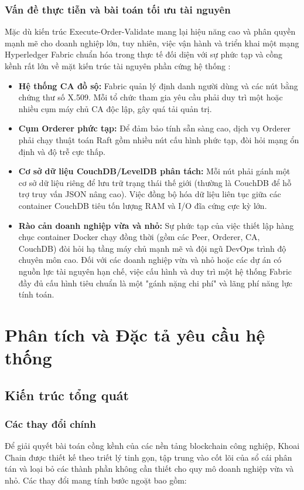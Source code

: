 \documentclass[12pt,a4paper]{article}
\begin{document}
\subsubsection{Vấn đề thực tiễn và bài toán tối ưu tài nguyên}
Mặc dù kiến trúc Execute-Order-Validate mang lại hiệu năng cao và phân quyền mạnh mẽ cho doanh nghiệp lớn, tuy nhiên, việc vận hành và triển khai một mạng Hyperledger Fabric chuẩn hóa trong thực tế đối diện với sự phức tạp và cồng kềnh rất lớn về mặt kiến trúc tài nguyên phần cứng hệ thống \cite{fabric}:
\begin{itemize}
    \item \textbf{Hệ thống CA đồ sộ:} Fabric quản lý định danh người dùng và các nút bằng chứng thư số X.509. Mỗi tổ chức tham gia yêu cầu phải duy trì một hoặc nhiều cụm máy chủ CA độc lập, gây quá tải quản trị.
    \item \textbf{Cụm Orderer phức tạp:} Để đảm bảo tính sẵn sàng cao, dịch vụ Orderer phải chạy thuật toán Raft gồm nhiều nút cấu hình phức tạp, đòi hỏi mạng ổn định và độ trễ cực thấp.
    \item \textbf{Cơ sở dữ liệu CouchDB/LevelDB phân tách:} Mỗi nút phải gánh một cơ sở dữ liệu riêng để lưu trữ trạng thái thế giới (thường là CouchDB để hỗ trợ truy vấn JSON nâng cao). Việc đồng bộ hóa dữ liệu liên tục giữa các container CouchDB tiêu tốn lượng RAM và I/O đĩa cứng cực kỳ lớn.
    \item \textbf{Rào cản doanh nghiệp vừa và nhỏ:} Sự phức tạp của việc thiết lập hàng chục container Docker chạy đồng thời (gồm các Peer, Orderer, CA, CouchDB) đòi hỏi hạ tầng máy chủ mạnh mẽ và đội ngũ DevOps trình độ chuyên môn cao. Đối với các doanh nghiệp vừa và nhỏ hoặc các dự án có nguồn lực tài nguyên hạn chế, việc cấu hình và duy trì một hệ thống Fabric đầy đủ cấu hình tiêu chuẩn là một "gánh nặng chi phí" và lãng phí năng lực tính toán.
\end{itemize}

\newpage

\section{Phân tích và Đặc tả yêu cầu hệ thống}
\subsection{Kiến trúc tổng quát}

\subsubsection{Các thay đổi chính}
Để giải quyết bài toán cồng kềnh của các nền tảng blockchain công nghiệp, Khoai Chain được thiết kế theo triết lý tinh gọn, tập trung vào cốt lõi của sổ cái phân tán và loại bỏ các thành phần không cần thiết cho quy mô doanh nghiệp vừa và nhỏ. Các thay đổi mang tính bước ngoặt bao gồm:
\end{document}
